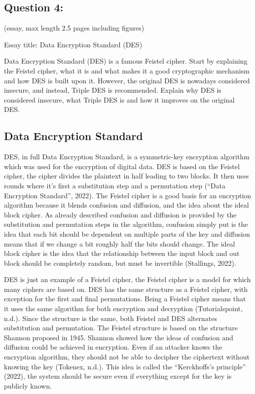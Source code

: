 \documentclass[11pt]{article}
\begin{document}
    \hypertarget{question-4}{%
\subsection{Question 4:}\label{question-4}}

(essay, max length 2.5 pages including figures)

Essay title: Data Encryption Standard (DES)

Data Encryption Standard (DES) is a famous Feistel cipher. Start by
explaining the Feistel cipher, what it is and what makes it a good
cryptographic mechanism and how DES is built upon it. However, the
original DES is nowadays considered insecure, and instead, Triple DES is
recommended. Explain why DES is considered insecure, what Triple DES is
and how it improves on the original DES.

    \hypertarget{data-encryption-standard}{%
\subsection{Data Encryption Standard}\label{data-encryption-standard}}

DES, in full Data Encryption Standard, is a symmetric-key encryption
algorithm which was used for the encryption of digital data. DES is
based on the Feistel cipher, the cipher divides the plaintext in half
leading to two blocks. It then uses rounds where it's first a
substitution step and a permutation step (``Data Encryption Standard'',
2022). The Feistel cipher is a good basis for an encryption algorithm
because it blends confusion and diffusion, and the idea about the ideal
block cipher. As already described confusion and diffusion is provided
by the substitution and permutation steps in the algorithm, confusion
simply put is the idea that each bit should be dependent on multiple
parts of the key and diffusion means that if we change a bit roughly
half the bits should change. The ideal block cipher is the idea that the
relationship between the input block and out block should be completely
random, but must be invertible (Stallings, 2022).

DES is just an example of a Feistel cipher, the Feistel cipher is a
model for which many ciphers are based on. DES has the same structure as
a Feistel cipher, with exception for the first and final permutations.
Being a Feistel cipher means that it uses the same algorithm for both
encryption and decryption (Tutorialspoint, n.d.). Since the structure is
the same, both Feistel and DES alternates substitution and permutation.
The Feistel structure is based on the structure Shannon proposed in
1945. Shannon showed how the ideas of confusion and diffusion could be
achieved in encryption. Even if an attacker knows the encryption
algorithm, they should not be able to decipher the ciphertext without
knowing the key (Tokenex, n.d.). This idea is called the ``Kerckhoffs's
principle'' (2022), the system should be secure even if everything
except for the key is publicly known.
\end{document}
